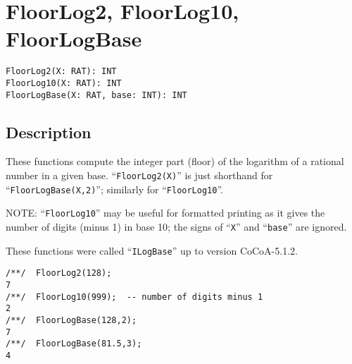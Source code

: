 \documentclass[a4paper]{mybook}
\newenvironment{command}{}{} %
\begin{document}
\section{FloorLog2, FloorLog10, FloorLogBase}
\label{FloorLog2, FloorLog10, FloorLogBase}
\begin{command} %


\begin{Verbatim}[label=syntax, rulecolor=\color{MidnightBlue},
frame=single]
FloorLog2(X: RAT): INT
FloorLog10(X: RAT): INT
FloorLogBase(X: RAT, base: INT): INT
\end{Verbatim}


\subsection*{Description}

These functions compute the integer part (floor) of the logarithm of a
rational number in a given base.  ``\verb&FloorLog2(X)&'' is just shorthand
for ``\verb&FloorLogBase(X,2)&''; similarly for ``\verb&FloorLog10&''.
\par 
NOTE: ``\verb&FloorLog10&'' may be useful for formatted printing as it
gives the number of digits (minus 1) in base 10; the signs of ``\verb&X&'' and
``\verb&base&'' are ignored.
\par 
These functions were called ``\verb&ILogBase&'' up to version CoCoA-5.1.2.
\begin{Verbatim}[label=example, rulecolor=\color{PineGreen}, frame=single]
/**/  FloorLog2(128);
7
/**/  FloorLog10(999);  -- number of digits minus 1
2
/**/  FloorLogBase(128,2);
7
/**/  FloorLogBase(81.5,3);
4
\end{Verbatim}


\end{command} %
\end{document}

